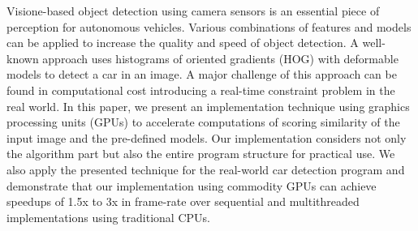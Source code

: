 Visione-based object detection using camera sensors is an essential piece
of perception for autonomous vehicles.
Various combinations of features and models can be applied to increase
the quality and speed of object detection.
A well-known approach uses histograms of oriented gradients (HOG)
with deformable models to detect a car in an image.
A major challenge of this approach can be found in computational cost
introducing a real-time constraint problem in the real world.
In this paper, we present an implementation technique using graphics
processing units (GPUs) to accelerate computations of scoring similarity
of the input image and the pre-defined models.
Our implementation considers not only the algorithm part but also the
entire program structure for practical use.
We also apply the presented technique for the real-world car detection
program and demonstrate that our implementation using commodity
GPUs can achieve speedups of 1.5x to 3x in frame-rate over sequential
and multithreaded implementations using traditional CPUs.